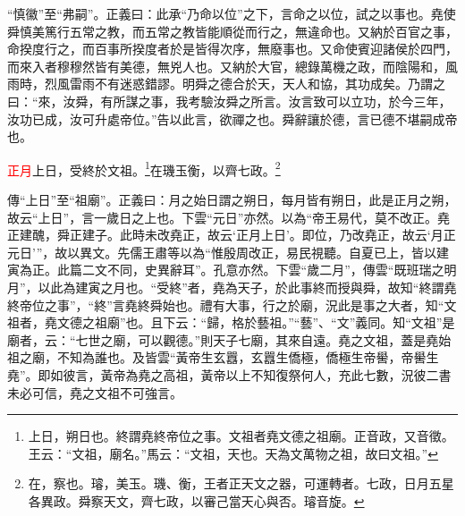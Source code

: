 {\noindent\shu{}\fzkt “慎徽”至“弗嗣”。正義曰：此承“乃命以位”之下，言命之以位，試之以事也。堯使舜慎美篤行五常之教，而五常之教皆能順從而行之，無違命也。又納於百官之事，命揆度行之，而百事所揆度者於是皆得次序，無廢事也。又命使賓迎諸侯於四門，而來入者穆穆然皆有美德，無兇人也。又納於大官，總錄萬機之政，而陰陽和，風雨時，烈風雷雨不有迷惑錯謬。明舜之德合於天，天人和協，其功成矣。乃謂之曰：“來，汝舜，有所謀之事，我考驗汝舜之所言。汝言致可以立功，於今三年，汝功已成，汝可升處帝位。”告以此言，欲禪之也。舜辭讓於德，言已德不堪嗣成帝也。 \par}

\textcolor{red}{正月}上日，受終於文祖。\footnote{上日，朔日也。終謂堯終帝位之事。文祖者堯文德之祖廟。正音政，又音徵。王云：“文祖，廟名。”馬云：“文祖，天也。天為文萬物之祖，故曰文祖。”}在璣玉衡，以齊七政。\footnote{在，察也。璿，美玉。璣、衡，王者正天文之器，可運轉者。七政，日月五星各異政。舜察天文，齊七政，以審己當天心與否。璿音旋。}

{\noindent\zhuan{}\fzbyks 傳“上日”至“祖廟”。正義曰：月之始日謂之朔日，每月皆有朔日，此是正月之朔，故云“上日”，言一歲日之上也。下雲“元日”亦然。以為“帝王易代，莫不改正。堯正建醜，舜正建子。此時未改堯正，故云‘正月上日’。即位，乃改堯正，故云‘月正元日’”，故以異文。先儒王肅等以為“惟殷周改正，易民視聽。自夏已上，皆以建寅為正。此篇二文不同，史異辭耳”。孔意亦然。下雲“歲二月”，傳雲“既班瑞之明月”，以此為建寅之月也。“受終”者，堯為天子，於此事終而授與舜，故知“終謂堯終帝位之事”，“終”言堯終舜始也。禮有大事，行之於廟，況此是事之大者，知“文祖者，堯文德之祖廟”也。且下云：“歸，格於藝祖。”“藝”、“文”義同。知“文祖”是廟者，云：“七世之廟，可以觀德。”則天子七廟，其來自遠。堯之文祖，蓋是堯始祖之廟，不知為誰也。及皆雲“黃帝生玄囂，玄囂生僑極，僑極生帝嚳，帝嚳生堯”。即如彼言，黃帝為堯之高祖，黃帝以上不知復祭何人，充此七數，況彼二書未必可信，堯之文祖不可強言。 \par}

